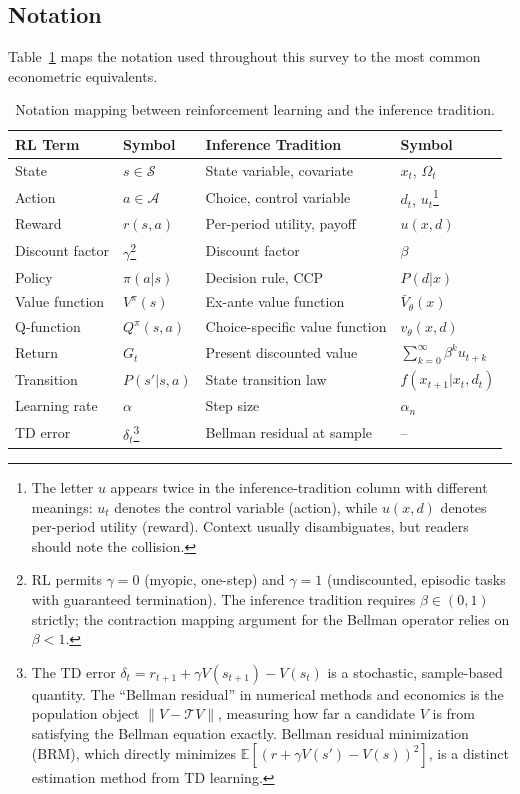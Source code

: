 \subsection{Notation}
\label{subsec:notation}

Table~\ref{tab:notation} maps the notation used throughout this survey to the most common econometric equivalents.

\begin{table}[h]
\centering
\caption{Notation mapping between reinforcement learning and the inference tradition.}
\label{tab:notation}
\begin{tabular}{llll}
\toprule
RL Term & Symbol & Inference Tradition & Symbol \\
\midrule
State & $s \in \mathcal{S}$ & State variable, covariate & $x_t$, $\Omega_t$ \\
Action & $a \in \mathcal{A}$ & Choice, control variable & $d_t$, $u_t$\footnote{The letter $u$ appears twice in the inference-tradition column with different meanings: $u_t$ denotes the control variable (action), while $u(x,d)$ denotes per-period utility (reward). Context usually disambiguates, but readers should note the collision.} \\
Reward & $r(s,a)$ & Per-period utility, payoff & $u(x,d)$ \\
Discount factor & $\gamma$\footnote{RL permits $\gamma = 0$ (myopic, one-step) and $\gamma = 1$ (undiscounted, episodic tasks with guaranteed termination). The inference tradition requires $\beta \in (0,1)$ strictly; the contraction mapping argument for the Bellman operator relies on $\beta < 1$.} & Discount factor & $\beta$ \\
Policy & $\pi(a|s)$ & Decision rule, CCP & $P(d|x)$ \\
Value function & $V^\pi(s)$ & Ex-ante value function & $\bar{V}_\theta(x)$ \\
Q-function & $Q^\pi(s,a)$ & Choice-specific value function & $v_\theta(x,d)$ \\
Return & $G_t$ & Present discounted value & $\sum_{k=0}^\infty \beta^k u_{t+k}$ \\
Transition & $P(s'|s,a)$ & State transition law & $f(x_{t+1} | x_t, d_t)$ \\
Learning rate & $\alpha$ & Step size & $\alpha_n$ \\
TD error & $\delta_t$\footnote{The TD error $\delta_t = r_{t+1} + \gamma V(s_{t+1}) - V(s_t)$ is a stochastic, sample-based quantity. The ``Bellman residual'' in numerical methods and economics is the population object $\|V - \mathcal{T}V\|$, measuring how far a candidate $V$ is from satisfying the Bellman equation exactly. Bellman residual minimization (BRM), which directly minimizes $\mathbb{E}[(r + \gamma V(s') - V(s))^2]$, is a distinct estimation method from TD learning.} & Bellman residual at sample & -- \\
\bottomrule
\end{tabular}
\end{table}
